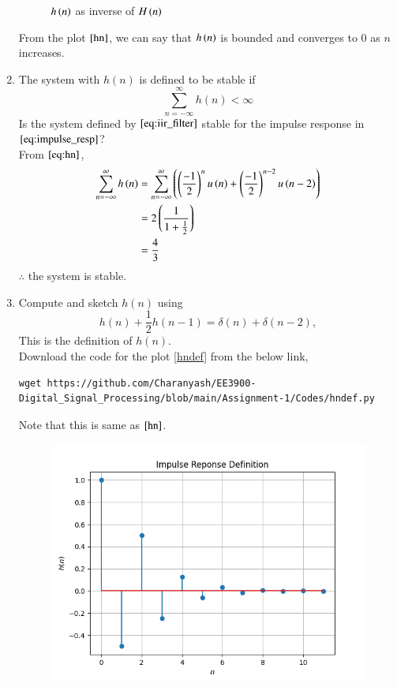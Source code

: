 \documentclass[journal,12pt,twocolumn]{IEEEtran}
\renewcommand\thesection{\arabic{section}}
\begin{document}
\begin{enumerate}[label=\thesection.\arabic*]
\begin{figure}[ht!]
      \caption{$h\left(n\right)$ as inverse of $H\left(n\right)$}     
      \label{hn}
     \end{figure}
    From the plot $\ref{hn}$, we can say that $h\left(n\right)$ is bounded and converges to $0$ as $n$ increases.
    \item The system with $h(n)$ is defined to be stable if
     \begin{equation}
      \sum_{n=-\infty}^{\infty}h(n) < \infty
     \end{equation}
        Is the system defined by $\eqref{eq:iir_filter}$ stable for the impulse response in $\eqref{eq:impulse_resp}$?\\
    \solution From $\eqref{eq:hn}$,
      \begin{align}
        \sum_{n=-\infty}^{\infty}h\left(n\right) &= \sum_{n=-\infty}^{\infty}\left(\left(\frac{-1}{2}\right)^{n} u\left(n\right) + \left(\frac{-1}{2}\right)^{n-2} u\left(n-2\right)\right)\\
                                           &= 2\left(\frac{1}{1+\frac{1}{2}}\right)\\
                                           &= \frac{4}{3}
      \end{align}
       $\therefore$ the system is stable.     
    \item Compute and sketch $h(n)$ using 
     \begin{equation}
      \label{eq:iir_filter_h}
      h(n) + \frac{1}{2}h(n-1) = \delta(n) + \delta(n-2), 
     \end{equation}
        This is the definition of $h(n)$.\\
    \solution Download the code for the plot \ref{hndef} from the below link,
     \begin{lstlisting}
wget https://github.com/Charanyash/EE3900-Digital_Signal_Processing/blob/main/Assignment-1/Codes/hndef.py
     \end{lstlisting}
     Note that this is same as $\ref{hn}$.
     \begin{figure}[ht!]
      \centering
      \includegraphics[width = \columnwidth]{hndef.png}

\end{figure}
\end{enumerate}
\end{document}
